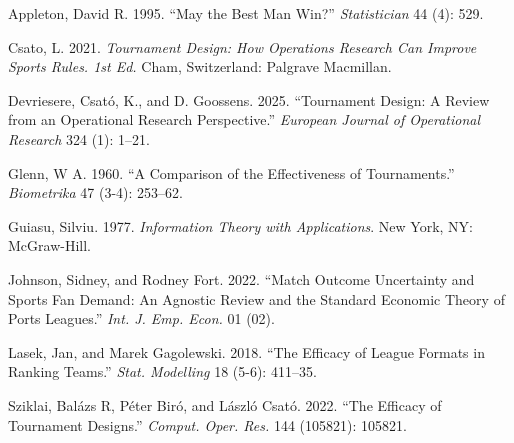 \documentclass[
  12pt,
]{article}
\newlength{\cslhangindent}
\newenvironment{CSLReferences}[2] %
 {\begin{list}{}{%
  \setlength{\itemindent}{0pt}
  \setlength{\leftmargin}{0pt}
  \setlength{\parsep}{0pt}
  \ifodd #1
   \setlength{\leftmargin}{\cslhangindent}
   \setlength{\itemindent}{-1\cslhangindent}
  \fi
  \setlength{\itemsep}{#2\baselineskip}}}
 {\end{list}}
\begin{document}
\label{refs}
\begin{CSLReferences}{1}{0}
Appleton, David R. 1995. {``May the Best Man Win?''} \emph{Statistician}
44 (4): 529.

Csato, L. 2021. \emph{Tournament Design: How Operations Research Can
Improve Sports Rules. 1st Ed.} Cham, Switzerland: Palgrave Macmillan.

Devriesere, Csató, K., and D. Goossens. 2025. {``Tournament Design: A
Review from an Operational Research Perspective.''} \emph{European
Journal of Operational Research} 324 (1): 1--21.

Glenn, W A. 1960. {``A Comparison of the Effectiveness of
Tournaments.''} \emph{Biometrika} 47 (3-4): 253--62.

Guiasu, Silviu. 1977. \emph{Information Theory with Applications}. New
York, NY: McGraw-Hill.

Johnson, Sidney, and Rodney Fort. 2022. {``Match Outcome Uncertainty and
Sports Fan Demand: An Agnostic Review and the Standard Economic Theory
of Ports Leagues.''} \emph{Int. J. Emp. Econ.} 01 (02).

Lasek, Jan, and Marek Gagolewski. 2018. {``The Efficacy of League
Formats in Ranking Teams.''} \emph{Stat. Modelling} 18 (5-6): 411--35.

Sziklai, Balázs R, Péter Biró, and László Csató. 2022. {``The Efficacy
of Tournament Designs.''} \emph{Comput. Oper. Res.} 144 (105821):
105821.

\end{CSLReferences}
\end{document}
